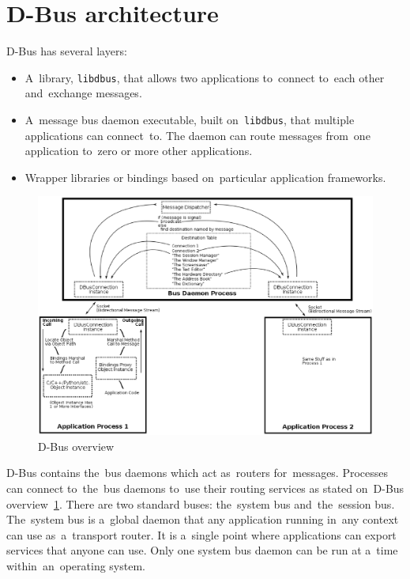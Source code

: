 \section{D-Bus architecture}
D-Bus has several layers:
\begin{itemize}
	\item A~library, \texttt{libdbus}, that allows two applications to~connect
		to~each other and~exchange messages.
	\item A~message bus daemon executable, built on~\texttt{libdbus},
		that multiple applications can connect~to. The daemon can route messages
		from~one application to~zero or more other applications.
	\item Wrapper libraries or bindings based on~particular application frameworks.
\end{itemize}


\begin{figure}[h]
\centering
\caption{D-Bus overview~\cite{DBUS}}
\label{fig:dbus_image}
\includegraphics[width=1\textwidth]{fig/dbus_diagram.eps}
\end{figure}


D-Bus contains the~bus daemons which act as~routers for~messages. Processes
can connect to~the~bus daemons to~use their routing services as stated on~D-Bus
overview~\ref{fig:dbus_image}. There are two standard buses: the~system bus
and~the~session bus.\\

The~system bus is a~global daemon that any application running in~any
context can use as~a~transport router. It is a~single point where applications
can export services that anyone can use. Only one system bus daemon
can be run at a~time within~an~operating system.\\

